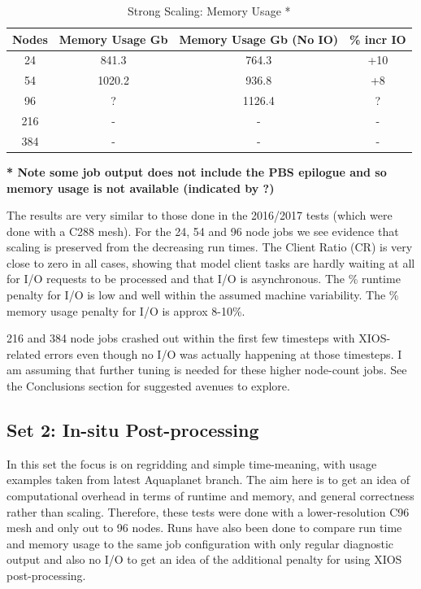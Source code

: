 \begin{table}[ht!]
\scriptsize
  \begin{center}
    \caption{Strong Scaling: Memory Usage *}
    \label{tab:table2}
     \begin{tabular}{|c|c|c|c|}
      \textbf{Nodes} & \textbf{Memory Usage Gb} & \textbf{Memory Usage Gb (No IO)} & \textbf{\% incr IO}\\
      \hline
      24 & 841.3 & 764.3 & +10 \\
      54 & 1020.2  & 936.8 & +8 \\
      96 & ? & 1126.4 & ? \\
      216 & - & - & -  \\
      384 & -  & -  & -  \\
    \end{tabular}
  \end{center}
\end{table}

\scriptsize \textbf{* Note some job output does not include the PBS epilogue and so memory usage is not available (indicated by ?)}
\newline

\normalsize
The results are very similar to those done in the 2016/2017 tests (which were done with a C288 mesh). For the 24, 54 and 96 node jobs we see
evidence that scaling is preserved from the decreasing run times. The Client Ratio (CR) is very close to zero in all cases, 
showing that model client tasks are hardly waiting at all for I/O requests to be processed and that I/O is asynchronous.
The \% runtime penalty for I/O is low and well within the assumed machine variability. The \% memory usage penalty for I/O is approx 8-10\%. 

216 and 384 node jobs crashed out within the first few timesteps with XIOS-related errors even though no I/O was
actually happening at those timesteps. I am assuming that further tuning is needed for these higher node-count jobs.
See the Conclusions section for suggested avenues to explore.

\subsection{Set 2: In-situ Post-processing}

In this set the focus is on regridding and simple time-meaning, with usage examples taken from latest Aquaplanet branch.
The aim here is to get an idea of computational overhead in terms of runtime and memory, and general correctness rather than scaling.
Therefore, these tests were done with a lower-resolution C96 mesh and only out to 96 nodes.
Runs have also been done to compare run time and memory usage to the same job configuration with only regular diagnostic output and also 
no I/O to get an idea of the additional penalty for using XIOS post-processing. 

